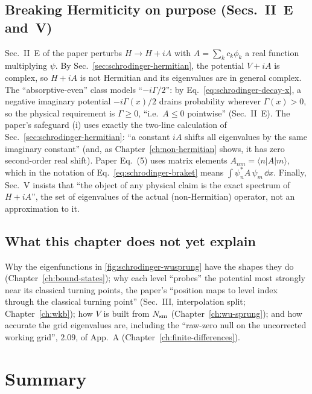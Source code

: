 \subsection{Breaking Hermiticity on purpose (Secs.~II~E and~V)}

Sec.~II~E of the paper perturbs $H\to H+iA$ with $A=\sum_kc_k\phi_k$ a real function multiplying $\psi$. By Sec.~\ref{sec:schrodinger-hermitian}, the potential $V+iA$ is complex, so $H+iA$ is not Hermitian and its eigenvalues are in general complex. The ``absorptive-even'' class models ``$-i\Gamma/2$'': by Eq.~\eqref{eq:schrodinger-decay-x}, a negative imaginary potential $-i\Gamma(x)/2$ drains probability wherever $\Gamma(x)>0$, so the physical requirement is $\Gamma\ge0$, ``i.e.\ $A\le0$ pointwise'' (Sec.~II~E). The paper's safeguard (i) uses exactly the two-line calculation of Sec.~\ref{sec:schrodinger-hermitian}: ``a constant $iA$ shifts all eigenvalues by the same imaginary constant'' (and, as Chapter~\ref{ch:non-hermitian} shows, it has zero second-order real shift). Paper Eq.~(5) uses matrix elements $A_{nm}=\langle n|A|m\rangle$, which in the notation of Eq.~\eqref{eq:schrodinger-braket} means $\int\psi_n^*A\,\psi_m\,\dd x$. Finally, Sec.~V insists that ``the object of any physical claim is the exact spectrum of $H+iA$'', the set of eigenvalues of the actual (non-Hermitian) operator, not an approximation to it.

\subsection{What this chapter does not yet explain}

Why the eigenfunctions in \cref{fig:schrodinger-wusprung} have the shapes they do (Chapter~\ref{ch:bound-states}); why each level ``probes'' the potential most strongly near its classical turning points, the paper's ``position maps to level index through the classical turning point'' (Sec.~III, interpolation split; Chapter~\ref{ch:wkb}); how $V$ is built from $N_{\mathrm{sm}}$ (Chapter~\ref{ch:wu-sprung}); and how accurate the grid eigenvalues are, including the ``raw-zero null on the uncorrected working grid'', $2.09$, of App.~A (Chapter~\ref{ch:finite-differences}).

\section{Summary}\label{sec:schrodinger-summary}

